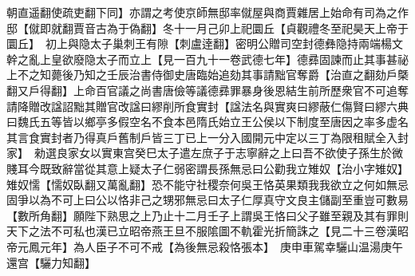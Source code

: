朝直遥翻使疏吏翻下同】亦謂之考使京師無邸率僦屋與商賈雜居上始命有司為之作邸【僦即就翻賈音古為于偽翻】冬十一月己卯上祀圜丘【貞觀禮冬至祀昊天上帝于圜丘】　初上與隐太子巢刺王有隙【刺盧逹翻】密明公贈司空封德彝隐持兩端楊文幹之亂上皇欲廢隐太子而立上【見一百九十一卷武德七年】德彞固諫而止其事甚祕上不之知薨後乃知之壬辰治書侍御史唐臨始追劾其事請黜官奪爵【治直之翻劾戶槩翻又戶得翻】上命百官議之尚書唐儉等議德彞罪暴身後恩結生前所歷衆官不可追奪請降贈改諡詔黜其贈官改諡曰繆削所食實封【諡法名與實爽曰繆蔽仁傷賢曰繆六典曰魏氏五等皆以鄉亭多假空名不食本邑隋氏始立王公侯以下制度至唐因之率多虚名其言食實封者乃得真戶舊制戶皆三丁已上一分入國開元中定以三丁為限租賦全入封家】　勑選良家女以實東宫癸巳太子遣左庶子于志寧辭之上曰吾不欲使子孫生於微賤耳今既致辭當從其意上疑太子仁弱密謂長孫無忌曰公勸我立雉奴【治小字雉奴】雉奴懦【懦奴臥翻又萬亂翻】恐不能守社稷奈何吳王恪英果類我我欲立之何如無忌固爭以為不可上曰公以恪非己之甥邪無忌曰太子仁厚真守文良主儲副至重豈可數易【數所角翻】願陛下熟思之上乃止十二月壬子上謂吳王恪曰父子雖至親及其有罪則天下之法不可私也漢已立昭帝燕王旦不服隂圖不軌霍光折簡誅之【見二十三卷漢昭帝元鳳元年】為人臣子不可不戒【為後無忌殺恪張本】　庚申車駕幸驪山温湯庚午還宫【驪力知翻】

